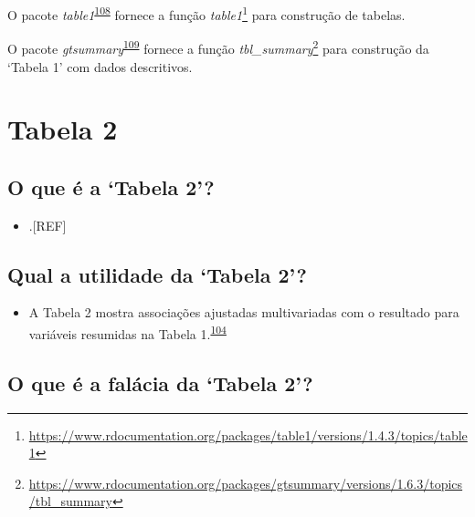 \documentclass[
  a4paper,
]{book}
\providecommand{\tightlist}{%
  \setlength{\itemsep}{0pt}\setlength{\parskip}{0pt}}
\renewcommand{\href}[2]{#2\footnote{\url{#1}}}
\newenvironment{infobox}[1]
  {
  \begin{itemize}
  \renewcommand{\labelitemi}{
    \raisebox{-.7\height}[0pt][0pt]{
      {\setkeys{Gin}{width=3em,keepaspectratio}
        \texttt{[image: \#1]}}
    }
  }
  \setlength{\fboxsep}{1em}
  \begin{blackbox}
  \item
  }
  {
  \end{blackbox}
  \end{itemize}
  }
\begin{document}
\begin{infobox}{images/Rlogo}
O pacote \emph{table1}\textsuperscript{\protect\hyperlink{ref-table1}{108}} fornece a função \href{https://www.rdocumentation.org/packages/table1/versions/1.4.3/topics/table1}{\emph{table1}} para construção de tabelas.

\end{infobox}

\begin{infobox}{images/Rlogo}
O pacote \emph{gtsummary}\textsuperscript{\protect\hyperlink{ref-gtsummary-2}{109}} fornece a função \href{https://www.rdocumentation.org/packages/gtsummary/versions/1.6.3/topics/tbl_summary}{\emph{tbl\_summary}} para construção da `Tabela 1' com dados descritivos.

\end{infobox}

\hypertarget{tabela-2}{%
\section{Tabela 2}\label{tabela-2}}

\hypertarget{o-que-uxe9-a-tabela-2}{%
\subsection{O que é a `Tabela 2'?}\label{o-que-uxe9-a-tabela-2}}

\begin{itemize}
\tightlist
\item
  .{[}REF{]}
\end{itemize}

\hypertarget{qual-a-utilidade-da-tabela-2}{%
\subsection{Qual a utilidade da `Tabela 2'?}\label{qual-a-utilidade-da-tabela-2}}

\begin{itemize}
\tightlist
\item
  A Tabela 2 mostra associações ajustadas multivariadas com o resultado para variáveis resumidas na Tabela 1.\textsuperscript{\protect\hyperlink{ref-Westreich2013}{104}}
\end{itemize}

\hypertarget{o-que-uxe9-a-faluxe1cia-da-tabela-2}{%
\subsection{O que é a falácia da `Tabela 2'?}\label{o-que-uxe9-a-faluxe1cia-da-tabela-2}}
\end{document}
